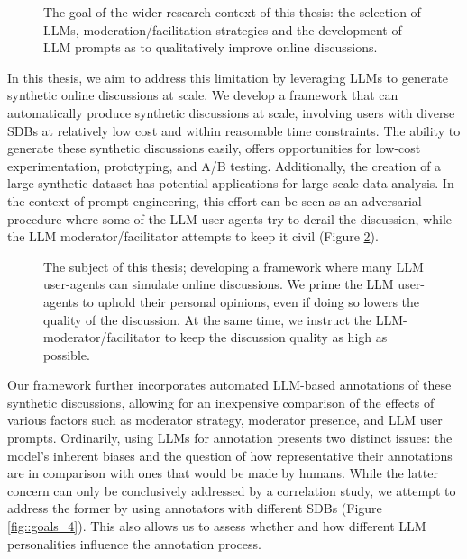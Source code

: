 \begin{figure}
	\centering
	
	\caption{The goal of the wider research context of this thesis: the selection of LLMs, moderation/facilitation strategies and the development of LLM prompts as to qualitatively improve online discussions.}
	\label{fig::goals_2}
\end{figure}

In this thesis, we aim to address this limitation by leveraging \acp{LLM} to generate synthetic online discussions at scale. We develop a framework that can automatically produce synthetic discussions at scale, involving users with diverse \acp{SDB} at relatively low cost and within reasonable time constraints. The ability to generate these synthetic discussions easily, offers opportunities for low-cost experimentation, prototyping, and A/B testing. Additionally, the creation of a large synthetic dataset has potential applications for large-scale data analysis. In the context of prompt engineering, this effort can be seen as an adversarial procedure where some of the LLM user-agents try to derail the discussion, while the LLM moderator/facilitator attempts to keep it civil (Figure \ref{fig::goals_3}).

\begin{figure}
	\centering
	
	\caption{The subject of this thesis; developing a framework where many LLM user-agents can simulate online discussions. We prime the LLM user-agents to uphold their personal opinions, even if doing so lowers the quality of the discussion. At the same time, we instruct the LLM-moderator/facilitator to keep the discussion quality as high as possible.}
	\label{fig::goals_3}
\end{figure}

Our framework further incorporates automated LLM-based annotations of these synthetic discussions, allowing for an inexpensive comparison of the effects of various factors such as moderator strategy, moderator presence, and LLM user prompts. Ordinarily, using LLMs for annotation presents two distinct issues: the model's inherent biases and the question of how representative their annotations are in comparison with ones that would be made by humans. While the latter concern can only be conclusively addressed by a correlation study, we attempt to address the former by using annotators with different \acp{SDB} (Figure \ref{fig::goals_4}). This also allows us to assess whether and how different LLM personalities influence the annotation process. 

